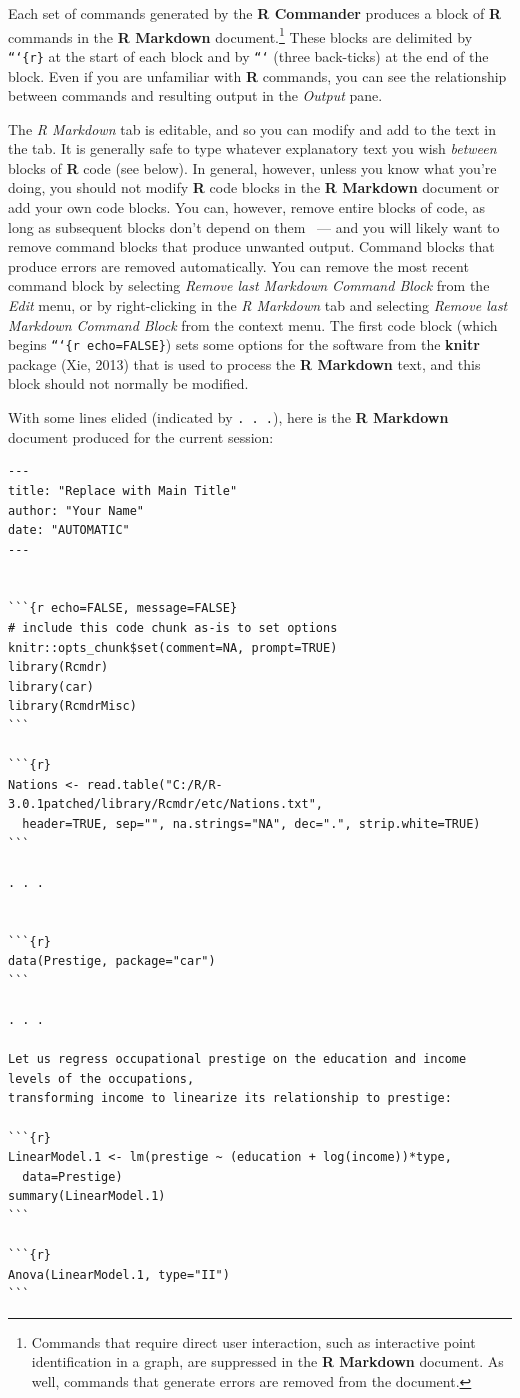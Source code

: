 \documentclass{article}%
\begin{document}
Each set of commands generated by the \textbf{R Commander} produces a block of
\textbf{R} commands in the \textbf{R Markdown} document.\footnote{Commands
that require direct user interaction, such as interactive point identification
in a graph, are suppressed in the \textbf{R Markdown} document. As well,
commands that generate errors are removed from the document.} These blocks are
delimited by \texttt{```\{r\}} at the start of each block and by \texttt{```}
(three back-ticks) at the end of the block. Even if you are unfamiliar with
\textbf{R} commands, you can see the relationship between commands and
resulting output in the \emph{Output} pane.

The \emph{R Markdown} tab is editable, and so you can modify and add to the
text in the tab. It is generally safe to type whatever explanatory text you
wish \emph{between} blocks of \textbf{R} code (see below). In general,
however, unless you know what you're doing, you should not modify \textbf{R}
code blocks in the \textbf{R Markdown} document or add your own code blocks.
You can, however, remove entire blocks of code, as long as subsequent blocks
don't depend on them \ --- and you will likely want to remove command blocks
that produce unwanted output. Command blocks that produce errors are removed
automatically. You can remove the most recent command block by selecting
\emph{Remove last Markdown Command Block} from the \emph{Edit} menu, or by
right-clicking in the \emph{R Markdown} tab and selecting \emph{Remove last
Markdown Command Block} from the context menu. The first code block (which
begins \texttt{```\{r echo=FALSE\}}) sets some options for the software from the \textbf{knitr} package (Xie,
2013) that is used to process the \textbf{R Markdown} text, and this block
should not normally be modified.

With some lines elided (indicated by \texttt{. . .}), here is the \textbf{R
Markdown} document produced for the current session:
\begin{verbatim}
---
title: "Replace with Main Title"
author: "Your Name"
date: "AUTOMATIC"
---


```{r echo=FALSE, message=FALSE}
# include this code chunk as-is to set options
knitr::opts_chunk$set(comment=NA, prompt=TRUE)
library(Rcmdr)
library(car)
library(RcmdrMisc)
```

```{r}
Nations <- read.table("C:/R/R-3.0.1patched/library/Rcmdr/etc/Nations.txt",
  header=TRUE, sep="", na.strings="NA", dec=".", strip.white=TRUE)
```

. . .


```{r}
data(Prestige, package="car")
```

. . .

Let us regress occupational prestige on the education and income levels of the occupations,
transforming income to linearize its relationship to prestige:

```{r}
LinearModel.1 <- lm(prestige ~ (education + log(income))*type,
  data=Prestige)
summary(LinearModel.1)
```

```{r}
Anova(LinearModel.1, type="II")
```

\end{verbatim}
\end{document}
